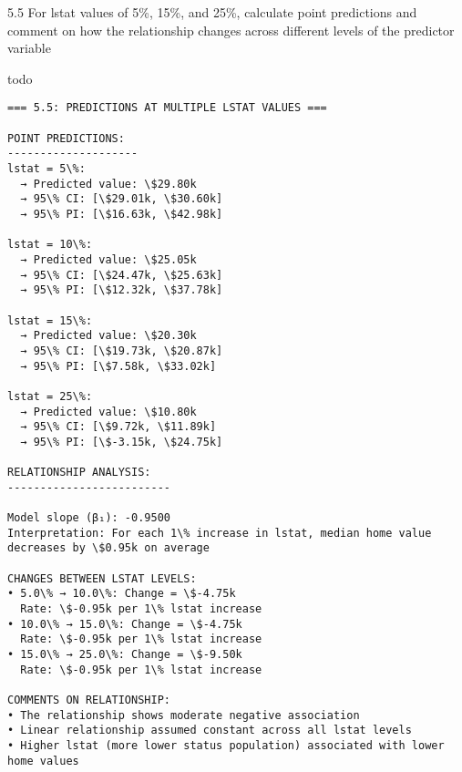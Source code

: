 \documentclass[11pt, twocolumn]{article}
\begin{document}
    5.5 For lstat values of 5\%, 15\%, and 25\%, calculate point predictions
and comment on how the relationship changes across different levels of
the predictor variable

todo

    \begin{Verbatim}[commandchars=\\\{\}]
=== 5.5: PREDICTIONS AT MULTIPLE LSTAT VALUES ===

POINT PREDICTIONS:
--------------------
lstat = 5\%:
  → Predicted value: \$29.80k
  → 95\% CI: [\$29.01k, \$30.60k]
  → 95\% PI: [\$16.63k, \$42.98k]

lstat = 10\%:
  → Predicted value: \$25.05k
  → 95\% CI: [\$24.47k, \$25.63k]
  → 95\% PI: [\$12.32k, \$37.78k]

lstat = 15\%:
  → Predicted value: \$20.30k
  → 95\% CI: [\$19.73k, \$20.87k]
  → 95\% PI: [\$7.58k, \$33.02k]

lstat = 25\%:
  → Predicted value: \$10.80k
  → 95\% CI: [\$9.72k, \$11.89k]
  → 95\% PI: [\$-3.15k, \$24.75k]

RELATIONSHIP ANALYSIS:
-------------------------

Model slope (β₁): -0.9500
Interpretation: For each 1\% increase in lstat, median home value
decreases by \$0.95k on average

CHANGES BETWEEN LSTAT LEVELS:
• 5.0\% → 10.0\%: Change = \$-4.75k
  Rate: \$-0.95k per 1\% lstat increase
• 10.0\% → 15.0\%: Change = \$-4.75k
  Rate: \$-0.95k per 1\% lstat increase
• 15.0\% → 25.0\%: Change = \$-9.50k
  Rate: \$-0.95k per 1\% lstat increase

COMMENTS ON RELATIONSHIP:
• The relationship shows moderate negative association
• Linear relationship assumed constant across all lstat levels
• Higher lstat (more lower status population) associated with lower home values
    \end{Verbatim}

    \begin{center}
    \end{center}
    { \hspace*{\fill} \\}
    
\end{document}
